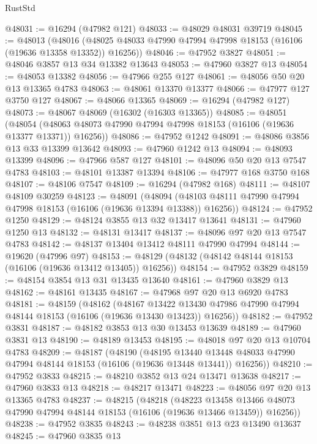 \begin{lexlean}{RustStd}
\begin{coremodule}
@48031 := @16294 (@47982 @121)
@48033 := @48029 @48031 @39719
@48045 := @48013
    (@48016 (@48025 @48033 @47990 @47994 @47998 @18153 (@16106 (@19636 @13358 @13352)) @16256))
@48046 := @47952 @3827
@48051 := @48046 @3857 @13 @34 @13382 @13643
@48053 := @47960 @3827 @13
@48054 := @48053 @13382
@48056 := @47966 @255 @127
@48061 := @48056 @50 @20 @13 @13365 @4783
@48063 := @48061 @13370 @13377
@48066 := @47977 @127 @3750 @127
@48067 := @48066 @13365
@48069 := @16294 (@47982 @127)
@48073 := @48067 @48069 (@16302 (@16303 @13365))
@48085 := @48051
    (@48054 (@48063 @48073 @47990 @47994 @47998 @18153 (@16106 (@19636 @13377 @13371)) @16256))
@48086 := @47952 @1242
@48091 := @48086 @3856 @13 @33 @13399 @13642
@48093 := @47960 @1242 @13
@48094 := @48093 @13399
@48096 := @47966 @587 @127
@48101 := @48096 @50 @20 @13 @7547 @4783
@48103 := @48101 @13387 @13394
@48106 := @47977 @168 @3750 @168
@48107 := @48106 @7547
@48109 := @16294 (@47982 @168)
@48111 := @48107 @48109 @30259
@48123 := @48091
    (@48094 (@48103 @48111 @47990 @47994 @47998 @18153 (@16106 (@19636 @13394 @13388)) @16256))
@48124 := @47952 @1250
@48129 := @48124 @3855 @13 @32 @13417 @13641
@48131 := @47960 @1250 @13
@48132 := @48131 @13417
@48137 := @48096 @97 @20 @13 @7547 @4783
@48142 := @48137 @13404 @13412 @48111 @47990 @47994
@48144 := @19620 (@47996 @97)
@48153 := @48129 (@48132 (@48142 @48144 @18153 (@16106 (@19636 @13412 @13405)) @16256))
@48154 := @47952 @3829
@48159 := @48154 @3854 @13 @31 @13435 @13640
@48161 := @47960 @3829 @13
@48162 := @48161 @13435
@48167 := @47968 @97 @20 @13 @6920 @4783
@48181 := @48159
    (@48162
      (@48167
        @13422
        @13430
        @47986
        @47990
        @47994
        @48144
        @18153
        (@16106 (@19636 @13430 @13423))
        @16256))
@48182 := @47952 @3831
@48187 := @48182 @3853 @13 @30 @13453 @13639
@48189 := @47960 @3831 @13
@48190 := @48189 @13453
@48195 := @48018 @97 @20 @13 @10704 @4783
@48209 := @48187
    (@48190
      (@48195
        @13440
        @13448
        @48033
        @47990
        @47994
        @48144
        @18153
        (@16106 (@19636 @13448 @13441))
        @16256))
@48210 := @47952 @3833
@48215 := @48210 @3852 @13 @24 @13471 @13638
@48217 := @47960 @3833 @13
@48218 := @48217 @13471
@48223 := @48056 @97 @20 @13 @13365 @4783
@48237 := @48215
    (@48218
      (@48223
        @13458
        @13466
        @48073
        @47990
        @47994
        @48144
        @18153
        (@16106 (@19636 @13466 @13459))
        @16256))
@48238 := @47952 @3835
@48243 := @48238 @3851 @13 @23 @13490 @13637
@48245 := @47960 @3835 @13

\end{coremodule}
\end{lexlean}
